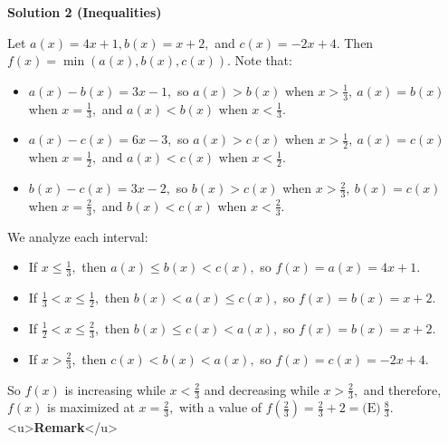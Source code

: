 \begin{enumerate}
\textbf{Solution 2 (Inequalities)}

Let $a(x) = 4x+1, b(x) = x+2,$ and $c(x) = -2x+4.$  Then $f(x) = \min(a(x), b(x), c(x)).$ Note that:

 
            \begin{itemize}
        \item $a(x) - b(x) = 3x - 1,$ so $a(x) > b(x)$ when $x > \frac{1}{3}, \ a(x) = b(x)$ when $x = \frac{1}{3},$ and $a(x) < b(x)$ when $x < \frac{1}{3}.$
            \end{itemize}
            
            \begin{itemize}
        \item $a(x) - c(x) = 6x - 3,$ so $a(x) > c(x)$ when $x > \frac{1}{2}, \ a(x) = c(x)$ when $x = \frac{1}{2},$ and $a(x) < c(x)$ when $x < \frac{1}{2}.$
            \end{itemize}
            
            \begin{itemize}
        \item $b(x) - c(x) = 3x - 2,$ so $b(x) > c(x)$ when $x > \frac{2}{3}, \ b(x) = c(x)$ when $x = \frac{2}{3},$ and $b(x) < c(x)$ when $x < \frac{2}{3}.$
            \end{itemize}
            We analyze each interval:

 
            \begin{itemize}
        \item If $x \leq \frac{1}{3},$ then $a(x) \leq b(x) < c(x),$ so $f(x) = a(x) = 4x+1.$
            \end{itemize}
            
            \begin{itemize}
        \item If $\frac{1}{3} < x \leq \frac{1}{2},$ then $b(x) < a(x) \leq c(x),$ so $f(x) = b(x) = x+2.$
            \end{itemize}
            
            \begin{itemize}
        \item If $\frac{1}{2} < x \leq \frac{2}{3},$ then $b(x) \leq c(x) < a(x),$ so $f(x) = b(x) = x+2.$
            \end{itemize}
            
            \begin{itemize}
        \item If $x > \frac{2}{3},$ then $c(x) < b(x) < a(x),$ so $f(x) = c(x) = -2x+4.$
            \end{itemize}
            So $f(x)$ is increasing while $x < \frac{2}{3}$ and decreasing while $x > \frac{2}{3},$ and therefore, $f(x)$ is maximized at $x = \frac{2}{3},$ with a value of $f\left(\frac{2}{3}\right) = \frac{2}{3} + 2 = \boxed{\text{(E)}\ \frac{8}{3}}.$
<u>\textbf{Remark}</u>


\end{enumerate}
